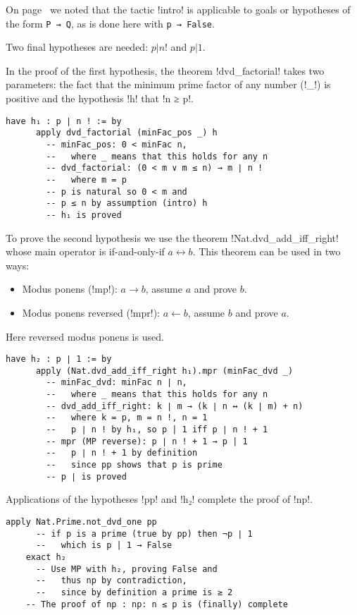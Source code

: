 On page~\pageref{p.intro} we noted that the tactic !intro! is applicable to goals or hypotheses of the form \Verb+P → Q+, as is done here with \Verb+p → False+.

Two final hypotheses are needed: \UndefineShortVerb{\!}$p | n!$\DefineShortVerb{\!} and $p | 1$.

In the proof of the first hypothesis, the theorem !dvd_factorial! takes two parameters: the fact that the minimum prime factor of any number (!_!) is positive and the hypothesis !h! that !n ≥ p!.
\begin{Verbatim}[firstnumber=last]
    have h₁ : p ∣ n ! := by
      apply dvd_factorial (minFac_pos _) h
        -- minFac_pos: 0 < minFac n,
        --   where _ means that this holds for any n
        -- dvd_factorial: (0 < m ∨ m ≤ n) → m ∣ n !
        --   where m = p
        -- p is natural so 0 < m and
        -- p ≤ n by assumption (intro) h
        -- h₁ is proved
\end{Verbatim}

To prove the second hypothesis we use the theorem !Nat.dvd_add_iff_right! whose main operator is if-and-only-if $a \leftrightarrow b$. This theorem can be used in two ways:
\begin{itemize}
\item Modus ponens (!mp!): $a \rightarrow b$, assume $a$ and prove $b$.
\item Modus ponens reversed (!mpr!): $a \leftarrow b$, assume $b$ and prove $a$.
\end{itemize}
Here reversed modus ponens is used.
\begin{Verbatim}[firstnumber=last]
    have h₂ : p ∣ 1 := by
      apply (Nat.dvd_add_iff_right h₁).mpr (minFac_dvd _)
        -- minFac_dvd: minFac n ∣ n,
        --   where _ means that this holds for any n
        -- dvd_add_iff_right: k ∣ m → (k ∣ n ↔ (k ∣ m) + n)
        --   where k = p, m = n !, n = 1
        --   p ∣ n ! by h₁, so p | 1 iff p ∣ n ! + 1
        -- mpr (MP reverse): p ∣ n ! + 1 → p | 1
        --   p ∣ n ! + 1 by definition
        --   since pp shows that p is prime
        -- p ∣ is proved
\end{Verbatim}

Applications of the hypotheses !pp! and !h₂! complete the proof of !np!.
\begin{Verbatim}[firstnumber=last]
    apply Nat.Prime.not_dvd_one pp
      -- if p is a prime (true by pp) then ¬p ∣ 1
      --   which is p | 1 → False
    exact h₂
      -- Use MP with h₂, proving False and
      --   thus np by contradiction,
      --   since by definition a prime is ≥ 2
    -- The proof of np : np: n ≤ p is (finally) complete
\end{Verbatim}

